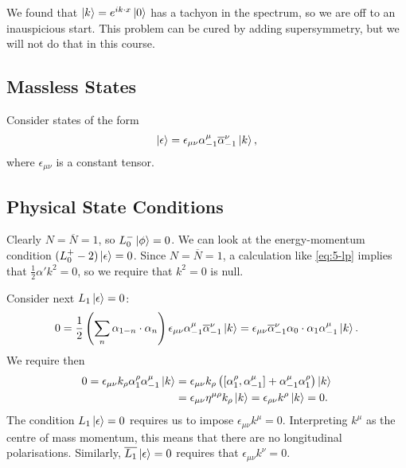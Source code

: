 
We found that $\ket{k} = e^{i k \cdot x} \ket{0}$  has a tachyon in the spectrum, so we are off to an inauspicious start.
This problem can be cured by adding supersymmetry, but we will not do that in this course.

\subsection{Massless States}%
\label{sub:massless_states}

Consider states of the form 
\begin{equation}
  \label{eq:6-ep}
  \ket{\epsilon} = \epsilon_{\mu\nu} \alpha^{\mu}_{-1} \overline{\alpha}^{\nu}_{-1} \ket{k},
\end{equation}
where $\epsilon_{\mu\nu}$ is a constant tensor.

\subsection*{Physical State Conditions}%

Clearly $N = \overline{N} = 1$, so $L_0^- \ket{\phi} = 0$.
We can look at the energy-momentum condition $(L_0^+ - 2) \ket{\epsilon} = 0$.
Since $N = \overline{N} = 1$, a calculation like \eqref{eq:5-lp} implies that $\frac{1}{2} \alpha' k^2 = 0$, so we require that $k^2 = 0$ is null.

Consider next $L_1 \ket{\epsilon} = 0$:
\begin{equation}
  0 = \frac{1}{2} \left( \sum_n \alpha_{1 - n} \cdot \alpha_n \right) \epsilon_{\mu\nu} \alpha^{\mu}_{-1} \overline{\alpha}_{-1}^{\nu} \ket{k} = \epsilon_{\mu\nu} \overline{\alpha}_{-1}^{\nu} \alpha_0 \cdot \alpha_1 \alpha_{-1}^{\mu} \ket{k}.
\end{equation}
We require then
\begin{align}
  0 = \epsilon_{\mu\nu} k_\rho \alpha^{\rho}_1 \alpha^{\mu}_{-1}\ket{k} &= \epsilon_{\mu\nu} k_{\rho} \left( [\alpha_1^{\rho}, \alpha_{-1}^{\mu}] + \alpha_{-1}^{\mu} \alpha^{\rho}_{1} \right) \ket{k} \\
  &=\epsilon_{\mu\nu} \eta^{\mu\rho} k_{\rho} \ket{k} = \epsilon_{\rho\nu} k^{\rho} \ket{k} = 0.
\end{align}
The condition $L_1 \ket{\epsilon} = 0$ requires us to impose $\epsilon_{\mu\nu} k^{\mu} = 0$.
Interpreting $k^{\mu}$ as the centre of mass momentum, this means that there are no longitudinal polarisations.
Similarly, $\overline{L_1}\ket{\epsilon} =0$ requires that $\epsilon_{\mu\nu} k^{\nu} = 0$.

